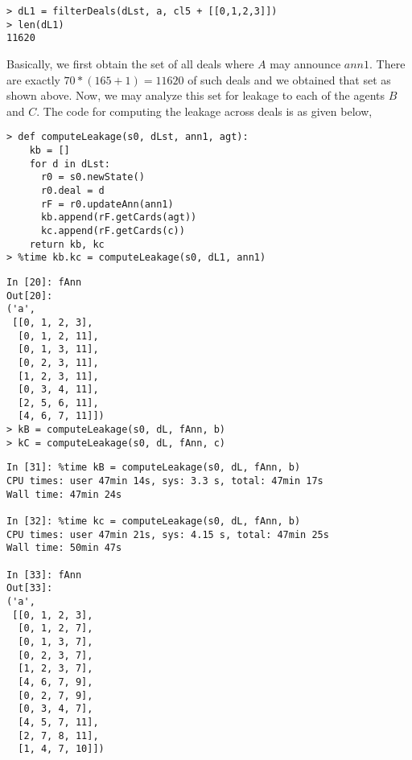 \begin{verbatim}
> dL1 = filterDeals(dLst, a, cl5 + [[0,1,2,3]])
> len(dL1)
11620
\end{verbatim}

Basically, we first obtain the set of all deals where $A$
may announce $ann1$. There are exactly $70*(165+1) = 11620$ of
such deals and we obtained that set as shown above. Now,
we may analyze this set for leakage to each of the agents $B$
and $C$. The code for computing the leakage across deals is as
given below,

\begin{verbatim}
> def computeLeakage(s0, dLst, ann1, agt):
    kb = []
    for d in dLst: 
      r0 = s0.newState()
      r0.deal = d
      rF = r0.updateAnn(ann1)
      kb.append(rF.getCards(agt))
      kc.append(rF.getCards(c))
    return kb, kc
> %time kb.kc = computeLeakage(s0, dL1, ann1)

\end{verbatim}

\begin{verbatim}
In [20]: fAnn
Out[20]: 
('a',
 [[0, 1, 2, 3],
  [0, 1, 2, 11],
  [0, 1, 3, 11],
  [0, 2, 3, 11],
  [1, 2, 3, 11],
  [0, 3, 4, 11],
  [2, 5, 6, 11],
  [4, 6, 7, 11]])
> kB = computeLeakage(s0, dL, fAnn, b) 
> kC = computeLeakage(s0, dL, fAnn, c)  
\end{verbatim}


\begin{verbatim}
In [31]: %time kB = computeLeakage(s0, dL, fAnn, b)
CPU times: user 47min 14s, sys: 3.3 s, total: 47min 17s
Wall time: 47min 24s

In [32]: %time kc = computeLeakage(s0, dL, fAnn, b)
CPU times: user 47min 21s, sys: 4.15 s, total: 47min 25s
Wall time: 50min 47s

In [33]: fAnn
Out[33]: 
('a',
 [[0, 1, 2, 3],
  [0, 1, 2, 7],
  [0, 1, 3, 7],
  [0, 2, 3, 7],
  [1, 2, 3, 7],
  [4, 6, 7, 9],
  [0, 2, 7, 9],
  [0, 3, 4, 7],
  [4, 5, 7, 11],
  [2, 7, 8, 11],
  [1, 4, 7, 10]])
\end{verbatim}
